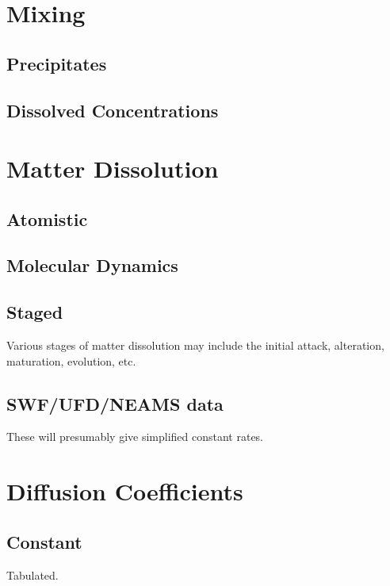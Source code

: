 \section{Mixing}

\subsection{Precipitates}

\subsection{Dissolved Concentrations}



\section{Matter Dissolution}

\subsection{ Atomistic }

\subsection{ Molecular Dynamics } 

\subsection{ Staged }

Various stages of matter dissolution may include the initial attack, alteration, 
maturation, evolution, etc.

\subsection{ SWF/UFD/NEAMS data}

These will presumably give simplified constant rates. 


\section{Diffusion Coefficients}

\subsection{ Constant }

Tabulated.

